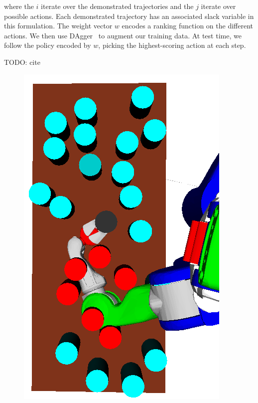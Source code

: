 where the $i$ iterate over the demonstrated trajectories and the $j$ iterate over possible actions. Each
demonstrated trajectory has an associated slack variable in this formulation.
The weight vector $w$ encodes a ranking function on the different actions.
We then use {\sc DAgger}~\cite{dagger} to augment our training data. At test time, we follow the policy encoded by
$w$, picking the highest-scoring action at each step.

TODO: cite 

\begin{figure}[t]
  \centering
    \noindent
    \includegraphics[scale=0.17, angle=270]{images/grasp_teaser_bad.png}

\end{figure}
